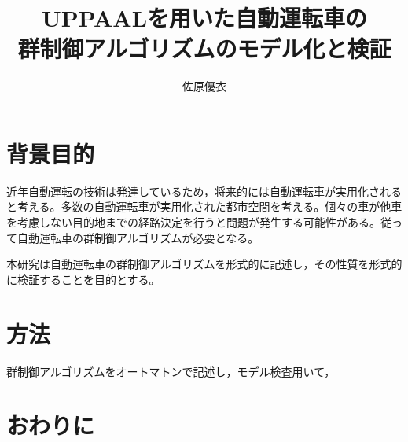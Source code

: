 \documentclass[twocolumn]{jsarticle}
\begin{document}
\title{UPPAALを用いた自動運転車の\\群制御アルゴリズムのモデル化と検証}
\author{佐原優衣}
\maketitle

\section*{背景目的}
近年自動運転の技術は発達しているため，将来的には自動運転車が実用化されると考える。多数の自動運転車が実用化された都市空間を考える。個々の車が他車を考慮しない目的地までの経路決定を行うと問題が発生する可能性がある。従って自動運転車の群制御アルゴリズムが必要となる。

本研究は自動運転車の群制御アルゴリズムを形式的に記述し，その性質を形式的に検証することを目的とする。
\section*{方法}
群制御アルゴリズムをオートマトンで記述し，モデル検査用いて，
\section*{おわりに}
\end{document}
